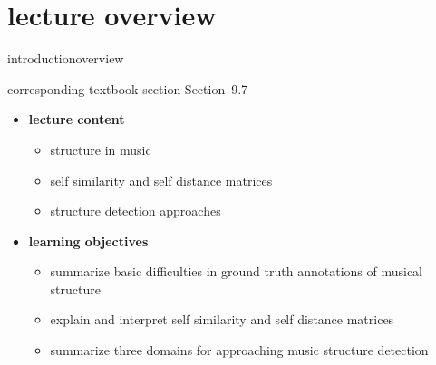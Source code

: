 


\subtitle{Module 9.7: Music Structure Detection}


	

    \section[overview]{lecture overview}
        \begin{frame}{introduction}{overview}
            \begin{block}{corresponding textbook section}
                    Section~9.7
            \end{block}

            \begin{itemize}
                \item   \textbf{lecture content}
                    \begin{itemize}
                        \item   structure in music
                        \item   self similarity and self distance matrices
                        \item   structure detection approaches
                    \end{itemize}
                \bigskip
                \item<2->   \textbf{learning objectives}
                    \begin{itemize}
                        \item   summarize basic difficulties in ground truth annotations of musical structure
                        \item   explain and interpret self similarity and self distance matrices
                        \item   summarize three domains for approaching music structure detection
                    \end{itemize}
            \end{itemize}
        \end{frame}


